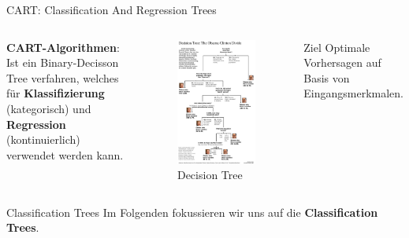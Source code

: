 \documentclass{beamer}
\begin{document}
\begin{frame}{CART: Classification And Regression Trees}
	\begin{columns}
		\textbf{CART-Algorithmen}: Ist ein Binary-Decisson Tree verfahren, welches für \textbf{Klassifizierung} (kategorisch) und \textbf{Regression} (kontinuierlich) verwendet werden kann.
			\begin{figure}
				\includegraphics[width=\linewidth]{Images/0416-nat-subOBAMA.jpg}
				\caption{Decision Tree \cite{Charbuty2021ClassificationBO}}
			\end{figure}
			
			\pause
			\begin{alertblock}{Ziel}
				Optimale Vorhersagen auf Basis von Eingangsmerkmalen.			
			\end{alertblock}
	\end{columns}
		
	
	\pause
	\begin{alertblock}{Classification Trees}
		Im Folgenden fokussieren wir uns auf die  \textbf{Classification Trees}.
	\end{alertblock}
\end{frame}
\end{document}
